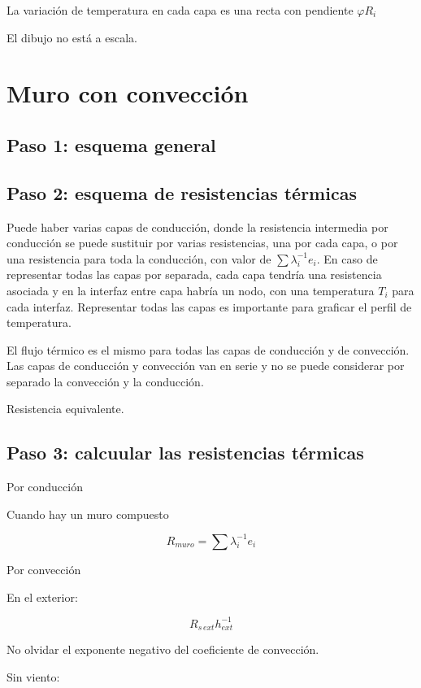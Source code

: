 \documentclass[12pt]{article}
\begin{document}
La variación de temperatura en cada capa es una recta con pendiente $ \varphi R_i $

El dibujo no está a escala.

\section{Muro con convección}

\subsection{Paso 1: esquema general}

\subsection{Paso 2: esquema de resistencias térmicas}

Puede haber varias capas de conducción, donde la resistencia intermedia por conducción se puede sustituir por varias resistencias, una por cada capa, o por una resistencia para toda la conducción, con valor de $ \sum{ \lambda ^{ -1 } _i } e_i $. En caso de representar todas las capas por separada, cada capa tendría una resistencia asociada y en la interfaz entre capa habría un nodo, con una temperatura $ T_i $ para cada interfaz. Representar todas las capas es importante para graficar el perfil de temperatura.

El flujo térmico es el mismo para todas las capas de conducción y de convección. Las capas de conducción y convección van en serie y no se puede considerar por separado la convección y la conducción.

Resistencia equivalente.

\subsection{Paso 3: calcuular las resistencias térmicas}

Por conducción

Cuando hay un muro compuesto

\[ R_{ muro } = \sum{ \lambda ^{ -1 } _i e_i } \]

Por convección

En el exterior:

\[ R_{ s \, ext } h_{ ext } ^{ -1 } \]

No olvidar el exponente negativo del coeficiente de convección.

Sin viento:
\end{document}
